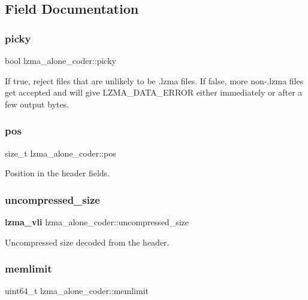 \subsection{Field Documentation}
\mbox{\label{structlzma__alone__coder_a6ed34033bee7ba2d029671109a652985}} 
\subsubsection{picky}
{\footnotesize\ttfamily bool lzma\+\_\+alone\+\_\+coder\+::picky}

If true, reject files that are unlikely to be .lzma files. If false, more non-\/.\+lzma files get accepted and will give L\+Z\+M\+A\+\_\+\+D\+A\+T\+A\+\_\+\+E\+R\+R\+OR either immediately or after a few output bytes. \mbox{\label{structlzma__alone__coder_a00ad67ef535a014b88efa30a61218c64}} 
\subsubsection{pos}
{\footnotesize\ttfamily size\+\_\+t lzma\+\_\+alone\+\_\+coder\+::pos}



Position in the header fields. 

\mbox{\label{structlzma__alone__coder_a66a7c8e4fa56069ca609b712d728bb2d}} 
\subsubsection{uncompressed\+\_\+size}
{\footnotesize\ttfamily \textbf{ lzma\+\_\+vli} lzma\+\_\+alone\+\_\+coder\+::uncompressed\+\_\+size}



Uncompressed size decoded from the header. 

\mbox{\label{structlzma__alone__coder_a6358c47e6fc4c8a9657631fa57433b6b}} 
\subsubsection{memlimit}
{\footnotesize\ttfamily uint64\+\_\+t lzma\+\_\+alone\+\_\+coder\+::memlimit}



